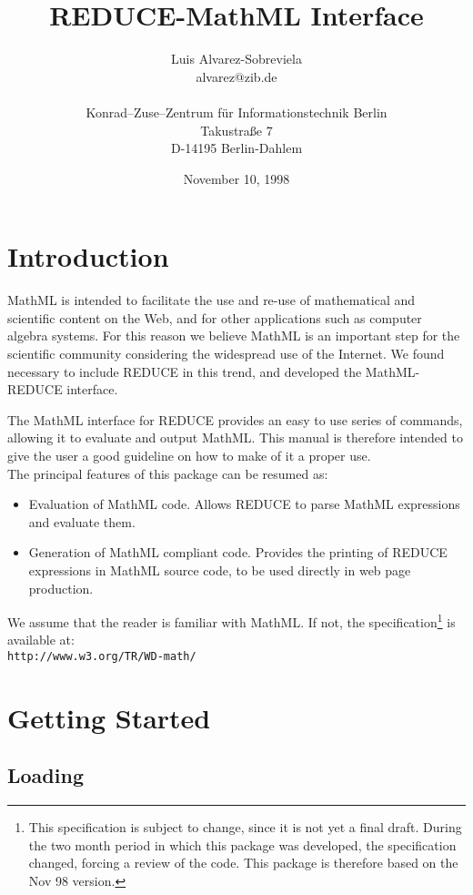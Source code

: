 \documentclass{article}
\title{REDUCE-MathML Interface}
\author{Luis Alvarez-Sobreviela \\ alvarez@zib.de \\ \\
	Konrad--Zuse--Zentrum f\"ur Informationstechnik Berlin \\
        Takustra\ss e 7 \\ D-14195 Berlin-Dahlem}
\date{November 10, 1998}
\begin{document}
\maketitle

\section{Introduction}

MathML is intended to facilitate the use and re-use of mathematical and
scientific content on the Web, and for other applications such as computer
algebra systems. For this reason we believe MathML is an important step
for the scientific community considering the widespread use of the
Internet. We found necessary to include REDUCE in this trend, and
developed the MathML-REDUCE interface.

The MathML interface for REDUCE provides an easy to use series of
commands, allowing it to evaluate and output MathML. This manual is
therefore intended to give the user a good guideline on how to make of it a
proper use. 
\\

The principal features of this package can be resumed as:  
\begin{itemize}
\item Evaluation of MathML code. Allows REDUCE to parse MathML expressions
and evaluate them. 
\item Generation of MathML compliant code. Provides the printing of REDUCE
expressions in MathML source code, to be used directly in web page
production. 

\end{itemize}

We assume that the reader is familiar with MathML. If not, the
specification\footnote{This specification is subject to change, since it is
not yet a final draft. During the two month period in which this package was
developed, the specification changed, forcing a review of the code. This
package is therefore based on the Nov 98 version.} 
is available at:
\\

{\tt http://www.w3.org/TR/WD-math/ }

\section{Getting Started}

\subsection{Loading}
\end{document}
